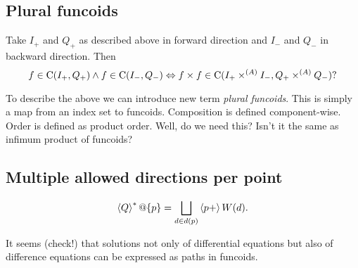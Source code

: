 \subsection{Plural funcoids}

Take $I_+$ and $Q_+$ as described above in forward direction and $I_-$ and $Q_-$ in backward direction. Then
\[ f\in\mathrm{C}(I_+,Q_+)\land f\in\mathrm{C}(I_-,Q_-) \Leftrightarrow f\times f\in\mathrm{C}(I_+\times^{(A)}I_-,Q_+\times^{(A)}Q_-)? \]

To describe the above we can introduce new term \emph{plural funcoids}. This is simply a map
from an index set to funcoids. Composition is defined component-wise. Order is defined as product order.
Well, do we need this? Isn't it the same as infimum product of funcoids?

\subsection{Multiple allowed directions per point}

\[ \rsupfun{Q}@\{p\} = \bigsqcup_{d\in d(p)} \supfun{p+} W(d). \]

It seems (check!) that solutions not only of differential equations but also of difference equations can be
expressed as paths in funcoids.
